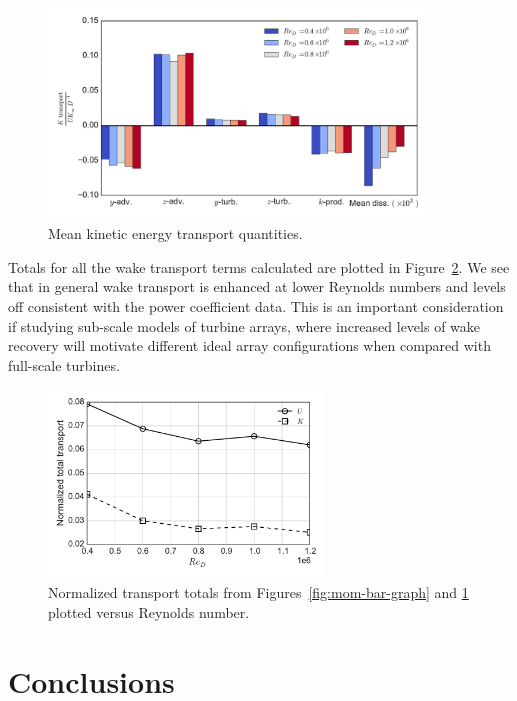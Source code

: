 \documentclass[energies,article,accept,moreauthors,pdftex,12pt,a4paper]{mdpi}
\begin{document}
\begin{figure}[ht]
\centering
\includegraphics[width=0.9\textwidth]{figures/K_trans_bar_graph}
\caption{Mean kinetic energy transport quantities.}
\label{fig:K-bar-graph}
\end{figure}


Totals for all the wake transport terms calculated are plotted in
Figure~\ref{fig:wake-trans-totals}. We see that in general wake transport is
enhanced at lower Reynolds numbers and levels off consistent with the power
coefficient data. This is an important consideration if studying sub-scale
models of turbine arrays, where increased levels of wake recovery will motivate
different ideal array configurations when compared with full-scale turbines.


\begin{figure}[ht]
\centering
\includegraphics[width=0.65\textwidth]{figures/wake_trans_totals}
\caption{Normalized transport totals from Figures~\ref{fig:mom-bar-graph} and 
\ref{fig:K-bar-graph} plotted versus Reynolds number.}
\label{fig:wake-trans-totals}
\end{figure}


\section{Conclusions}
\end{document}
